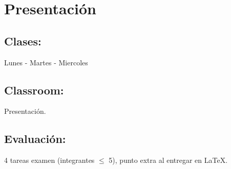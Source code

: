 \chapter{Presentación} %
\label{chap:Presentación}



\section{Clases:}
Lunes - Martes - Miercoles

\section{Classroom:} Presentación. 

\section{Evaluación:} 4 tareas examen (integrantes $\leq$ 5), punto extra al entregar en \LaTeX. 
